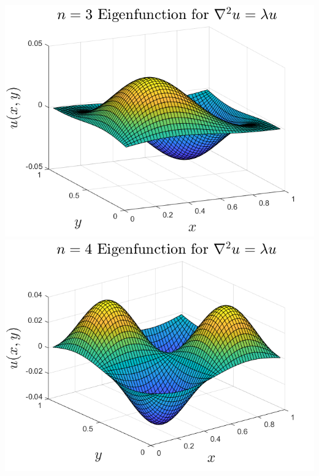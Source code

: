 \documentclass{article}
\begin{document}
\begin{enumerate}
\begin{center}
        \includegraphics[scale = 0.4]{n3eig.png}
        \includegraphics[scale = 0.4]{n4eig.png}
    \end{center}
\end{enumerate}
\end{document}

